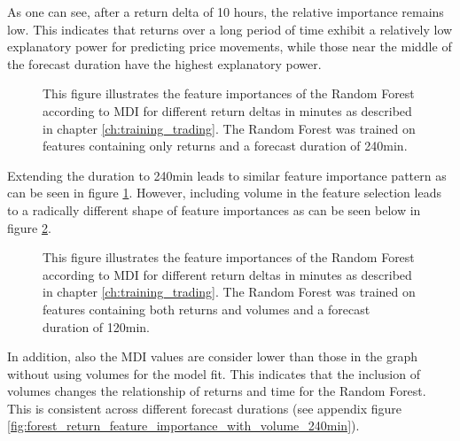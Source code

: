 As one can see, after a return delta of 10 hours, the relative importance remains low. 
This indicates that returns over a long period of time exhibit a relatively low explanatory power for
predicting price movements, while those near the middle of the forecast duration have the highest explanatory power.

\begin{figure}[H]
    \captionsetup{format=plain}
    \caption{ 
            This figure illustrates the feature importances of the Random Forest according to MDI \cite{louppe2015variableImportance}
            for different return deltas in minutes as described in chapter \ref{ch:training_trading}. 
            The Random Forest was trained on features containing only returns and a forecast duration of 240min.
        }
    \label{fig:forest_return_feature_importance_no_volume_240min}
\end{figure}

Extending the duration to 240min leads to similar feature importance pattern as can be seen in figure \ref{fig:forest_return_feature_importance_no_volume_240min}.
However, including volume in the feature selection leads to a radically different shape of feature importances 
as can be seen below in figure \ref{fig:forest_return_feature_importance_with_volume_120min}.

\begin{figure}[H]
    \captionsetup{format=plain}
    \caption{ 
            This figure illustrates the feature importances of the Random Forest according to MDI \cite{louppe2015variableImportance}
            for different return deltas in minutes as described in chapter \ref{ch:training_trading}. 
            The Random Forest was trained on features containing both returns and volumes and a forecast duration of 120min.
        }
    \label{fig:forest_return_feature_importance_with_volume_120min}
\end{figure}

In addition, also the MDI values are consider lower than those in the graph without using volumes for the model fit. 
This indicates that the inclusion of volumes changes the relationship of returns and time for the Random Forest.
This is consistent across different forecast durations (see appendix figure \ref{fig:forest_return_feature_importance_with_volume_240min}).


